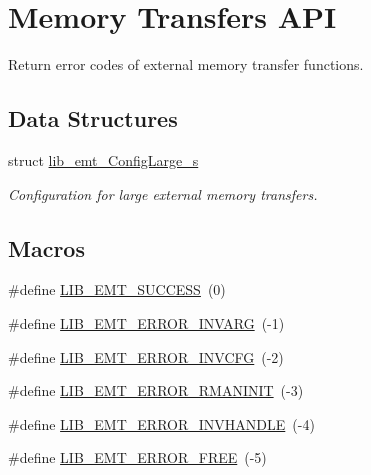\hypertarget{group__libarch__memtrans}{}\section{Memory Transfers A\+P\+I}
\label{group__libarch__memtrans}


Return error codes of external memory transfer functions.  


\subsection*{Data Structures}
\begin{DoxyCompactItemize}
\item 
struct \hyperlink{structlib__emt__ConfigLarge__s}{lib\+\_\+emt\+\_\+\+Config\+Large\+\_\+s}
\begin{DoxyCompactList}\small\item\em Configuration for large external memory transfers. \end{DoxyCompactList}\end{DoxyCompactItemize}
\subsection*{Macros}
\begin{DoxyCompactItemize}
\item 
\#define \hyperlink{group__libarch__memtrans_ga6682ba347b624952140c5ead3301a8be}{L\+I\+B\+\_\+\+E\+M\+T\+\_\+\+S\+U\+C\+C\+E\+S\+S}~(0)
\item 
\#define \hyperlink{group__libarch__memtrans_ga7c00744552e888fa1c1da7bafc3fb362}{L\+I\+B\+\_\+\+E\+M\+T\+\_\+\+E\+R\+R\+O\+R\+\_\+\+I\+N\+V\+A\+R\+G}~(-\/1)
\item 
\#define \hyperlink{group__libarch__memtrans_gaec3d5fb167114b1c4dbf5d3a6220b0d1}{L\+I\+B\+\_\+\+E\+M\+T\+\_\+\+E\+R\+R\+O\+R\+\_\+\+I\+N\+V\+C\+F\+G}~(-\/2)
\item 
\#define \hyperlink{group__libarch__memtrans_ga9189f70619c7a767d69d7fe8b9500e7e}{L\+I\+B\+\_\+\+E\+M\+T\+\_\+\+E\+R\+R\+O\+R\+\_\+\+R\+M\+A\+N\+I\+N\+I\+T}~(-\/3)
\item 
\#define \hyperlink{group__libarch__memtrans_ga7ca25bc939f597f627bc633b7256c05e}{L\+I\+B\+\_\+\+E\+M\+T\+\_\+\+E\+R\+R\+O\+R\+\_\+\+I\+N\+V\+H\+A\+N\+D\+L\+E}~(-\/4)
\item 
\#define \hyperlink{group__libarch__memtrans_ga5262fd9542b2a9beb4f9b6a7c1215a95}{L\+I\+B\+\_\+\+E\+M\+T\+\_\+\+E\+R\+R\+O\+R\+\_\+\+F\+R\+E\+E}~(-\/5)
\end{DoxyCompactItemize}
